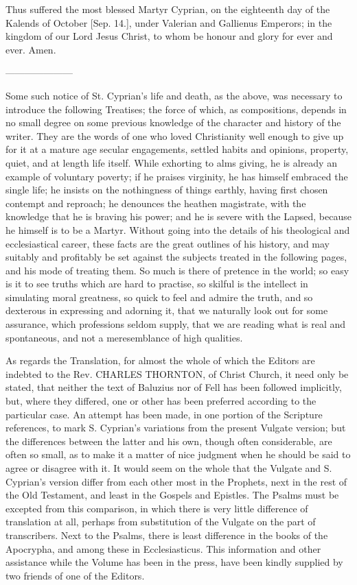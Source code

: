 Thus suffered the most blessed
Martyr Cyprian, on the eighteenth day of the Kalends of October [Sep.
14.], under Valerian and Gallienus Emperors;
in the kingdom of our Lord Jesus Christ, to whom be honour and glory
for ever and ever. Amen.

———————

Some such notice of St.
Cyprian's life and death, as the above, was necessary to introduce the
following Treatises; the force of which, as compositions, depends in
no small degree on some previous knowledge of the character and
history of the writer. They are the words of one who loved
Christianity well enough to give up for it at a mature age secular
engagements, settled habits and opinions, property, quiet, and at
length life itself. While exhorting to alms giving, he is already an
example of voluntary poverty; if he praises virginity, he has himself
embraced the single life; he insists on the nothingness of things
earthly, having first chosen contempt and reproach; he denounces the
heathen magistrate, with the knowledge that he is braving his power;
and he is severe with the Lapsed, because he himself is to be a
Martyr. Without going into the details of his theological and
ecclesiastical career, these facts are the great outlines of his
history, and may suitably and profitably be set against the subjects
treated in the following pages, and his mode of treating them. So much
is there of pretence in the world; so easy is it to see truths which
are hard to practise, so skilful is the intellect in simulating moral
greatness, so quick to feel and admire the truth, and so dexterous in
expressing and adorning it, that we naturally look out for some
assurance, which professions seldom supply, that we are reading what
is real and spontaneous, and not a mere\emph{}semblance of high
qualities.

As regards the Translation,
for almost the whole of which the Editors are indebted to the
Rev. CHARLES
THORNTON, of Christ Church, it need only be
stated, that neither the text of Baluzius nor of Fell has been
followed implicitly, but, where they differed, one or other has been
preferred according to the particular case. An attempt has been made,
in one portion of the Scripture references, to mark S. Cyprian's
variations from the present Vulgate version; but the differences
between the latter and his own, though often considerable, are often
so small, as to make it a matter of nice judgment when he should be
said to agree or disagree with it. It would seem on the whole that the
Vulgate and S. Cyprian's version differ from each other most in the
Prophets, next in the rest of the Old Testament, and least in the
Gospels and Epistles. The Psalms must be excepted from this
comparison, in which there is very little difference of translation at
all, perhaps from substitution of the Vulgate on the part of
transcribers. Next to the Psalms, there is least difference in the
books of the Apocrypha, and among these in Ecclesiasticus. This
information and other assistance while the Volume has been in the
press, have been kindly supplied by two friends of one of the Editors.

